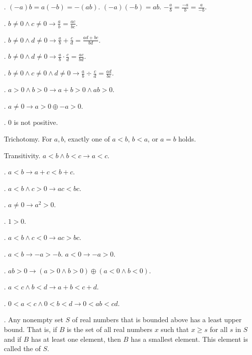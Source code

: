 \documentclass{slnotes}
\begin{document}
. \((-a)b = a(-b) = -(ab)\). \((-a)(-b) = ab\). \(-\frac{a}{b} = \frac{-a}{b} = \frac{a}{-b}\).

. \(b \neq 0 \land c \neq 0 \to \frac{a}{b} = \frac{ac}{bc}\).

. \(b \neq 0 \land d \neq 0 \to \frac{a}{b} + \frac{c}{d} = \frac{ad + bc}{bd}\).

. \(b \neq 0 \land d \neq 0 \to \frac{a}{b} \cdot \frac{c}{d} = \frac{ac}{bd}\).

. \(b \neq 0 \land c \neq 0 \land d \neq 0 \to \frac{a}{b} \div \frac{c}{d} = \frac{ad}{bc}\).

. \(a > 0 \land b > 0 \to a + b > 0 \land ab > 0\).

. \(a \neq 0 \to a > 0 \oplus -a > 0\).

. \(0\) is not positive.

 Trichotomy. For \(a, b\), exactly one of \(a < b\), \(b < a\), or \(a = b\) holds.

 Transitivity. \(a < b \land b < c \to a < c\).

. \(a < b \to a + c < b + c\).

. \(a < b \land c > 0 \to ac < bc\).

. \(a \neq 0 \to a^2 > 0\).

. \(1 > 0\).

. \(a < b \land c < 0 \to ac > bc\).

. \(a < b \to -a > -b\). \(a < 0 \to -a > 0\).

. \(ab > 0 \to (a > 0 \land b > 0) \oplus (a < 0 \land b < 0)\).

. \(a < c \land b < d \to a + b < c + d\).

. \(0 < a < c \land 0 < b < d \to 0 < ab < cd\).

. Any nonempty set \(S\) of real numbers that is bounded above has a least upper bound. That is, if \(B\) is the set of all real numbers \(x\) such that \(x \ge s\) for all \(s\) in \(S\) and if \(B\) has at least one element, then \(B\) has a smallest element. This element is called the  of \(S\).
\end{document}
